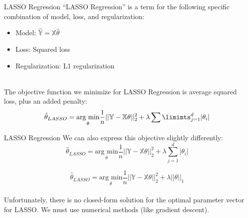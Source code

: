 \documentclass[aspectratio=169]{../latex_main/tntbeamer}  %
\begin{document}
	
	\begin{frame}{LASSO  Regression}
	    “LASSO Regression” is a term for the following specific combination of model, loss, and regularization:
	    \begin{itemize}
	        \item Model: $\mathbb{\hat{Y}} = \mathbb{X}\hat{\theta}$
	        \item Loss: Squared loss
	        \item Regularization: L1 regularization
	    \end{itemize}\\
	    \bigskip
	    The objective function we minimize for LASSO  Regression is average squared loss, plus an added penalty:
	    \begin{equation*}
	        \hat{\theta}_{LASSO} = \underset{\theta}{\text{arg min}}\frac{1}{n}||\mathbb{Y} - \mathbb{X}\theta||_2^2 + \lambda \sum\limimts_{j=1}^d|\theta_i|
	    \end{equation*}
	\end{frame}
	
	
	
	\begin{frame}{LASSO  Regression}
	    We can also express this objective slightly differently:
	    \begin{equation*}
	        \hat{\theta}_{LASSO} = \underset{\theta}{\text{arg min}}\frac{1}{n}||\mathbb{Y} - \mathbb{X}\theta||_2^2 + \lambda \sum\limits_{j=1}^d|\theta_i|
	    \end{equation*}
	    
	    \begin{equation*}
	        \hat{\theta}_{LASSO} = \underset{\theta}{\text{arg min}}\frac{1}{n}||\mathbb{Y} - \mathbb{X}\theta||_2^2 + \lambda ||\theta ||_1
	    \end{equation*}
	    \bigskip
	   \\Unfortunately, there is no closed-form solution for the optimal parameter vector for LASSO. We must use numerical methods (like gradient descent).

	\end{frame}
	
\end{document}
